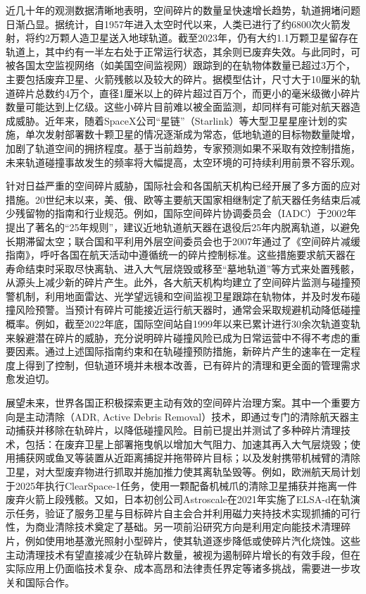 近几十年的观测数据清晰地表明，空间碎片的数量呈快速增长趋势，轨道拥堵问题日渐凸显。据统计，自1957年进入太空时代以来，人类已进行了约6800次火箭发射，将约2万颗人造卫星送入地球轨道​。截至2023年，仍有大约1.1万颗卫星留存在轨道上，其中约有一半左右处于正常运行状态，其余则已废弃失效\cite{prol2022position,nozawa2023extent}。与此同时，可被各国太空监视网络（如美国空间监视网）跟踪到的在轨物体数量已超过3万个，主要包括废弃卫星、火箭残骸以及较大的碎片​。据模型估计，尺寸大于10厘米的轨道碎片总数约4万个，直径1厘米以上的碎片超过百万个，而更小的毫米级微小碎片数量可能达到上亿级​。这些小碎片目前难以被全面监测，却同样有可能对航天器造成威胁。近年来，随着SpaceX公司“星链”（Starlink）等大型卫星星座计划的实施，单次发射部署数十颗卫星的情况逐渐成为常态，低地轨道的目标物数量陡增，加剧了轨道空间的拥挤程度。基于当前趋势，专家预测如果不采取有效控制措施，未来轨道碰撞事故发生的频率将大幅提高，太空环境的可持续利用前景不容乐观。

针对日益严重的空间碎片威胁，国际社会和各国航天机构已经开展了多方面的应对措施。20世纪末以来，美、俄、欧等主要航天国家相继制定了航天器任务结束后减少残留物的指南和行业规范。例如，国际空间碎片协调委员会（IADC）于2002年提出了著名的“25年规则”，建议近地轨道航天器在退役后25年内脱离轨道，以避免长期滞留太空；联合国和平利用外层空间委员会也于2007年通过了《空间碎片减缓指南》，呼吁各国在航天活动中遵循统一的碎片控制标准。这些措施要求航天器在寿命结束时采取尽快离轨、进入大气层烧毁或移至“墓地轨道”等方式来处置残骸，从源头上减少新的碎片产生。此外，各大航天机构均建立了空间碎片监测与碰撞预警机制，利用地面雷达、光学望远镜和空间监视卫星跟踪在轨物体，并及时发布碰撞风险预警。当预计有碎片可能接近运行航天器时，通常会采取规避机动降低碰撞概率。例如，截至2022年底，国际空间站自1999年以来已累计进行30余次轨道变轨来躲避潜在碎片的威胁，充分说明碎片碰撞风险已成为日常运营中不得不考虑的重要因素。通过上述国际指南约束和在轨碰撞预防措施，新碎片产生的速率在一定程度上得到了控制，但轨道环境并未根本改善，已有碎片的清理和更全面的管理需求愈发迫切。

展望未来，世界各国正积极探索更主动有效的空间碎片治理方案。其中一个重要方向是主动清除（ADR, Active Debris Removal）技术，即通过专门的清除航天器主动捕获并移除在轨碎片，以降低碰撞风险。目前已提出并测试了多种碎片清理技术，包括：在废弃卫星上部署拖曳帆以增加大气阻力、加速其再入大气层烧毁；使用捕获网或鱼叉等装置从近距离捕捉并拖带碎片目标；以及发射携带机械臂的清除卫星，对大型废弃物进行抓取并施加推力使其离轨坠毁等。例如，欧洲航天局计划于2025年执行ClearSpace-1任务，使用一颗配备机械爪的清除卫星捕获并拖离一件废弃火箭上段残骸\cite{zhao2022overview}。又如，日本初创公司Astroscale在2021年实施了ELSA-d在轨演示任务，验证了服务卫星与目标碎片自主会合并利用磁力夹持技术实现抓捕的可行性，为商业清除技术奠定了基础。另一项前沿研究方向是利用定向能技术清理碎片，例如使用地基激光照射小型碎片，使其轨道逐步降低或使碎片汽化烧蚀\cite{nozawa2023extent}。这些主动清理技术有望直接减少在轨碎片数量，被视为遏制碎片增长的有效手段，但在实际应用上仍面临技术复杂、成本高昂和法律责任界定等诸多挑战，需要进一步攻关和国际合作。





